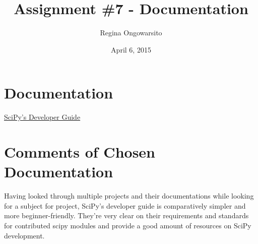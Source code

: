 \documentclass{article}
\author{Regina Ongowarsito}
\title{Assignment \#7 - Documentation}
\date{April 6, 2015}
\begin{document}
\maketitle

\section{Documentation}
\href{http://docs.scipy.org/doc/scipy-dev/reference/hacking.html}{SciPy's Developer Guide}

\section{Comments of Chosen Documentation}
Having looked through multiple projects and their documentations while looking for a subject for project, SciPy's developer guide is comparatively simpler and more beginner-friendly. They're very clear on their requirements and standards for contributed scipy modules and provide a good amount of resources on SciPy development.
\end{document}
